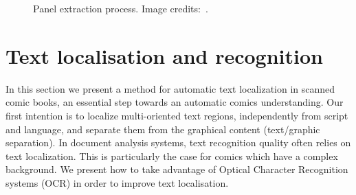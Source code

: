 \begin{figure}[!ht]
	  \hspace{1em}
	  \caption[Independent panel extraction process]{Panel extraction process. Image credits:~\cite{Lubbin12}.}
	  \label{fig:in:panel_detection_process}
\end{figure}


\section{Text localisation and recognition} %
\label{sec:in:text_localisation_and_recognition}

In this section we present a method for automatic text localization in scanned comic books, an essential step towards an automatic comics understanding.
Our first intention is to localize multi-oriented text regions, independently from script and language, and separate them from the graphical content (text/graphic separation).
In document analysis systems, text recognition quality often relies on text localization.
This is particularly the case for comics which have a complex background.
We present how to take advantage of Optical Character Recognition systems (OCR) in order to improve text localisation.


